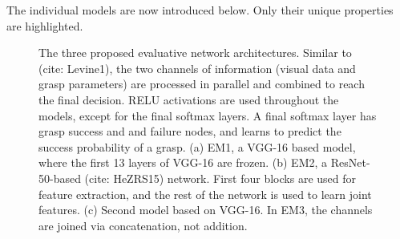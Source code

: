 The individual models are now introduced below. Only their unique properties are highlighted.

\begin{figure}[t]
\centering


\caption{The three proposed evaluative network architectures. Similar to (cite: Levine1), the two channels of information (visual data and grasp parameters) are processed in parallel and combined to reach the final decision. RELU activations are used throughout the models, except for the final softmax layers. A final softmax layer has grasp success and and failure nodes, and learns to predict the success probability of a grasp. (a) EM1, a VGG-16 based model, where the first 13 layers of VGG-16 are frozen. (b) EM2, a ResNet-50-based (cite: HeZRS15) network. First four blocks are used for feature extraction, and the rest of the network is used to learn joint features. (c) Second model based on VGG-16. In EM3, the channels are joined via concatenation, not addition.}
\label{fig:networkArchitecture2}
\end{figure}

